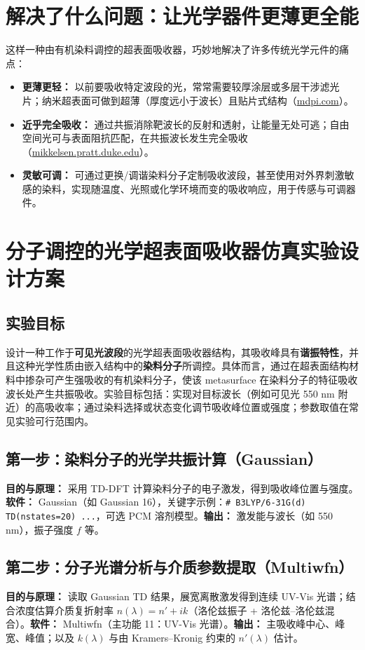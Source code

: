 \documentclass[11pt]{ctexart}
\begin{document}
\section{解决了什么问题：让光学器件更薄更全能}
这样一种由有机染料调控的超表面吸收器，巧妙地解决了许多传统光学元件的痛点：
\begin{itemize}
  \item \textbf{更薄更轻：} 以前要吸收特定波段的光，常常需要较厚涂层或多层干涉滤光片；纳米超表面可做到超薄（厚度远小于波长）且贴片式结构（\url{mdpi.com}）。
  \item \textbf{近乎完全吸收：} 通过共振消除靶波长的反射和透射，让能量无处可逃；自由空间光可与表面阻抗匹配，在共振波长发生完全吸收（\url{mikkelsen.pratt.duke.edu}）。
  \item \textbf{灵敏可调：} 可通过更换/调谐染料分子定制吸收波段，甚至使用对外界刺激敏感的染料，实现随温度、光照或化学环境而变的吸收响应，用于传感与可调器件。
\end{itemize}

\section{分子调控的光学超表面吸收器仿真实验设计方案}
\subsection{实验目标}
设计一种工作于\textbf{可见光波段}的光学超表面吸收器结构，其吸收峰具有\textbf{谐振特性}，并且这种光学性质由嵌入结构中的\textbf{染料分子}所调控。具体而言，通过在超表面结构材料中掺杂可产生强吸收的有机染料分子，使该 metasurface 在染料分子的特征吸收波长处产生共振吸收。实验目标包括：实现对目标波长（例如可见光 550 nm 附近）的高吸收率；通过染料选择或状态变化调节吸收峰位置或强度；参数取值在常见实验可行范围内。

\subsection{第一步：染料分子的光学共振计算（Gaussian）}
\textbf{目的与原理：} 采用 TD-DFT 计算染料分子的电子激发，得到吸收峰位置与强度。\textbf{软件：} Gaussian（如 Gaussian 16），关键字示例：\texttt{\# B3LYP/6-31G(d) TD(nstates=20) ...}，可选 PCM 溶剂模型。\textbf{输出：} 激发能与波长（如 550 nm），振子强度 $f$ 等。

\subsection{第二步：分子光谱分析与介质参数提取（Multiwfn）}
\textbf{目的与原理：} 读取 Gaussian TD 结果，展宽离散激发得到连续 UV-Vis 光谱；结合浓度估算介质复折射率 $n(\lambda)=n'+ik$（洛伦兹振子 + 洛伦兹–洛伦兹混合）。\textbf{软件：} Multiwfn（主功能 11：UV-Vis 光谱）。\textbf{输出：} 主吸收峰中心、峰宽、峰值；以及 $k(\lambda)$ 与由 Kramers–Kronig 约束的 $n'(\lambda)$ 估计。
\end{document}
